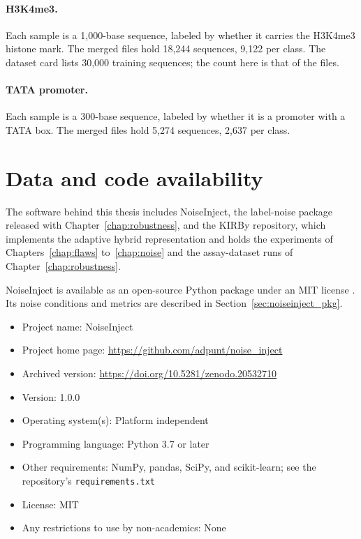 \paragraph{H3K4me3.} Each sample is a 1,000-base sequence, labeled by whether it carries the H3K4me3 histone mark. The merged files hold 18,244 sequences, 9,122 per class. The dataset card lists 30,000 training sequences; the count here is that of the files.

\paragraph{TATA promoter.} Each sample is a 300-base sequence, labeled by whether it is a promoter with a TATA box. The merged files hold 5,274 sequences, 2,637 per class.

\section{Data and code availability}\label{app:availability}

The software behind this thesis includes NoiseInject, the label-noise package released with Chapter~\ref{chap:robustness}, and the KIRBy repository, which implements the adaptive hybrid representation and holds the experiments of Chapters~\ref{chap:flaws} to~\ref{chap:noise} and the assay-dataset runs of Chapter~\ref{chap:robustness}.

NoiseInject is available as an open-source Python package under an MIT license \citep{noiseinject}. Its noise conditions and metrics are described in Section~\ref{sec:noiseinject_pkg}.

\begin{itemize}
    \item Project name: NoiseInject
    \item Project home page: \url{https://github.com/adpunt/noise_inject}
    \item Archived version: \url{https://doi.org/10.5281/zenodo.20532710}
    \item Version: 1.0.0
    \item Operating system(s): Platform independent
    \item Programming language: Python 3.7 or later
    \item Other requirements: NumPy, pandas, SciPy, and scikit-learn; see the repository's \texttt{requirements.txt}
    \item License: MIT
    \item Any restrictions to use by non-academics: None
\end{itemize}

